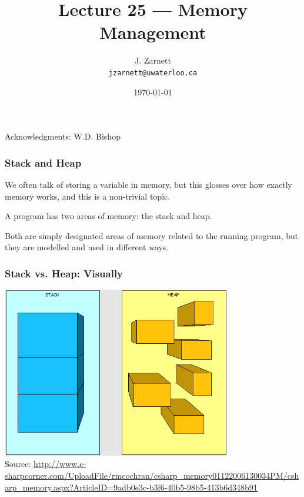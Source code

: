 

\title{Lecture 25 --- Memory Management }

\author{J. Zarnett\\
\texttt{jzarnett@uwaterloo.ca}}
\date{\today}



\begin{frame}
  \titlepage
  
  \begin{center}
  \small{Acknowledgments: W.D. Bishop}
  \end{center}
\end{frame}

\begin{frame}
\frametitle{Stack and Heap}
We often talk of storing a variable in memory, but this glosses over how exactly memory works, and this is a non-trivial topic.

A program has two areas of memory: the \alert{stack} and \alert{heap}.

Both are simply designated areas of memory related to the running program, but they are modelled and used in different ways.

\end{frame}

\begin{frame}
\frametitle{Stack vs. Heap: Visually}

\begin{center}
\includegraphics[width=0.75\textwidth]{images/stackheap.png}\\
{\tiny Source: \url{http://www.c-sharpcorner.com/UploadFile/rmcochran/csharp_memory01122006130034PM/csharp_memory.aspx?ArticleID=9adb0e3c-b3f6-40b5-98b5-413b6d348b91} }
\end{center}

\end{frame}

